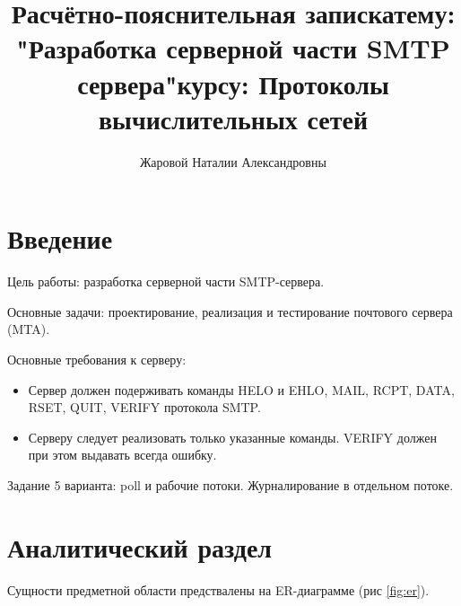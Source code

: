 \documentclass[a4paper,12pt]{report}
\title{Расчётно-пояснительная записка\newlineна тему: "Разработка серверной части SMTP сервера"\newlineпо курсу: Протоколы вычислительных сетей}
\author{Жаровой Наталии Александровны\newline}
\begin{document}
\maketitle

\tableofcontents

\chapter*{Введение}

Цель работы: разработка серверной части SMTP-сервера.

Основные задачи: проектирование, реализация и тестирование почтового сервера
(MTA).

Основные требования к серверу: 
\begin{itemize}
\item Сервер должен подерживать команды HELO и EHLO, MAIL, RCPT, DATA, RSET,
QUIT, VERIFY протокола SMTP. 
\item Серверу следует реализовать только указанные команды. VERIFY должен при этом
выдавать всегда ошибку.
\end{itemize}

Задание 5 варианта: poll и рабочие потоки. Журналирование в
отдельном потоке.

%

\chapter{Аналитический раздел}

Сущности предметной области предствалены на ER-диаграмме (рис \ref{fig:er}).
\end{document}
